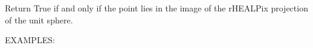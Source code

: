 \documentclass[a4paper,12ptopenany,oneside,english]{sphinxmanual}
\begin{document}
\begin{fulllineitems}
\label{\detokenize{pj_rhealpix:rhealpixdggs.pj_rhealpix.in_rhealpix_image}}
\pysigstartsignatures
{}
\pysigstopsignatures
\sphinxAtStartPar
Return True if and only if the point  lies in the image of
the rHEALPix projection of the unit sphere.

\sphinxAtStartPar
EXAMPLES:


\end{fulllineitems}
\end{document}
